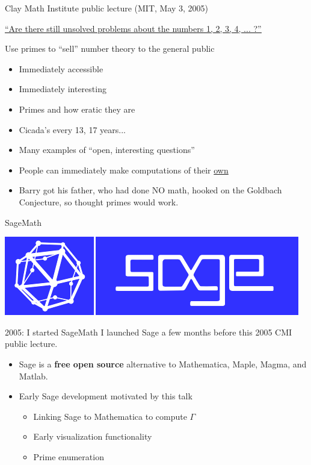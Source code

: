 \documentclass{beamer}
\begin{document}
\begin{frame}{Clay Math Institute public lecture (MIT, May 3, 2005)}
\begin{center}
  \href{http://www.claymath.org/library/public\_lectures/mazur\_riemann\_hypothesis.pdf}{\small\underline{``Are there still unsolved problems about the numbers 1, 2, 3, 4, ... ?''}}
\end{center}

  \vfill

  \begin{block}{Use primes to ``sell'' number theory to the general public}
    \begin{itemize}
      \item   Immediately accessible
      \item   Immediately interesting
      \item   Primes and how eratic they are
      \item   Cicada's every 13, 17 years...
      \item   Many examples of ``open, interesting questions''
      \item   People can immediately make computations of their \underline{own}
      \item   Barry got his father, who had done NO
            math, hooked on the Goldbach Conjecture, so thought
            primes would work.
    \end{itemize}
  \end{block}
\end{frame}

\begin{frame}{SageMath}
  \vfill
  \begin{center}
    \includegraphics[width=.7\textwidth]{pics/sage-logo}
  \end{center}
  \vfill

  \begin{block}{2005: I started SageMath}
    I launched Sage a few months before this 2005 CMI public lecture.
    \begin{itemize}
      \item Sage is a {\bf free open source} alternative to Mathematica, Maple, Magma, and Matlab.
      \item Early Sage development motivated by this talk
            \begin{itemize}
              \item Linking Sage to Mathematica to compute $\Gamma$
              \item Early visualization functionality
              \item Prime enumeration
            \end{itemize}
    \end{itemize}
  \end{block}
\end{frame}
\end{document}
